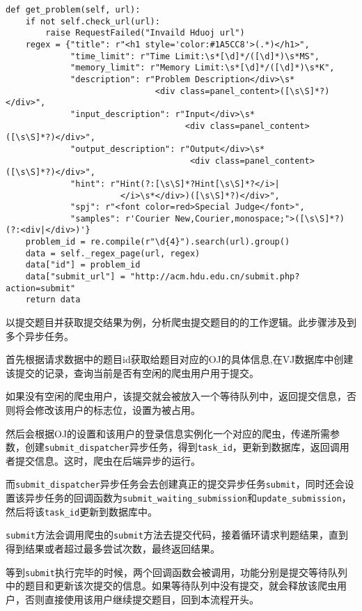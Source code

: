 \begin{verbatim}
def get_problem(self, url):
    if not self.check_url(url):
        raise RequestFailed("Invaild Hduoj url")
    regex = {"title": r"<h1 style='color:#1A5CC8'>(.*)</h1>",
             "time_limit": r"Time Limit:\s*[\d]*/([\d]*)\s*MS",
             "memory_limit": r"Memory Limit:\s*[\d]*/([\d]*)\s*K",
             "description": r"Problem Description</div>\s*
                              <div class=panel_content>([\s\S]*?)</div>",
             "input_description": r"Input</div>\s*
                                    <div class=panel_content>([\s\S]*?)</div>",
             "output_description": r"Output</div>\s*
                                     <div class=panel_content>([\s\S]*?)</div>",
             "hint": r"Hint(?:[\s\S]*?Hint[\s\S]*?</i>|
                       </i>\s*</div>)([\s\S]*?)</div>",
             "spj": r"<font color=red>Special Judge</font>",
             "samples": r'Courier New,Courier,monospace;">([\s\S]*?)(?:<div|</div>)'}
    problem_id = re.compile(r"\d{4}").search(url).group()
    data = self._regex_page(url, regex)
    data["id"] = problem_id
    data["submit_url"] = "http://acm.hdu.edu.cn/submit.php?action=submit"
    return data
\end{verbatim}

以提交题目并获取提交结果为例，分析爬虫提交题目的的工作逻辑。此步骤涉及到多个异步任务。

首先根据请求数据中的题目id获取给题目对应的OJ的具体信息,在VJ数据库中创建该提交的记录，查询当前是否有空闲的爬虫用户用于提交。

如果没有空闲的爬虫用户，该提交就会被放入一个等待队列中，返回提交信息，否则将会修改该用户的标志位，设置为被占用。

然后会根据OJ的设置和该用户的登录信息实例化一个对应的爬虫，传递所需参数，创建\texttt{submit\_dispatcher}异步任务，得到\texttt{task\_id}，更新到数据库，返回调用者提交信息。这时，爬虫在后端异步的运行。

而\texttt{submit\_dispatcher}异步任务会去创建真正的提交异步任务\texttt{submit}，同时还会设置该异步任务的回调函数为\texttt{submit\_waiting\_submission}和\texttt{update\_submission}，然后将该\texttt{task\_id}更新到数据库中。

\texttt{submit}方法会调用爬虫的\texttt{submit}方法去提交代码，接着循环请求判题结果，直到得到结果或者超过最多尝试次数，最终返回结果。

等到\texttt{submit}执行完毕的时候，两个回调函数会被调用，功能分别是提交等待队列中的题目和更新该次提交的信息。如果等待队列中没有提交，就会释放该爬虫用户，否则直接使用该用户继续提交题目，回到本流程开头。

